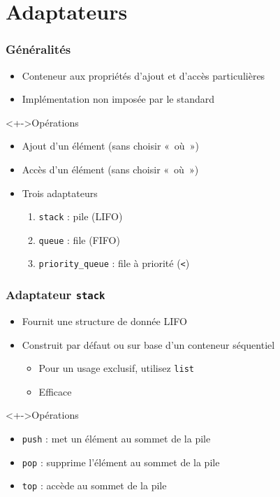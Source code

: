 \section{Adaptateurs}

\begin{frame}
\frametitle{Généralités}
\begin{itemize}[<+->]
\item Conteneur aux propriétés d'ajout et d'accès particulières
\item Implémentation non imposée par le standard
\end{itemize}
\begin{exampleblock}<+->{Opérations}
	\begin{itemize}[<+->]
	\item Ajout d'un élément (sans choisir «~où~»)
	\item Accès d'un élément (sans choisir «~où~»)
	\end{itemize}
\end{exampleblock}
\begin{itemize}[<+->]
\item Trois adaptateurs
	\begin{enumerate}
	\item \texttt{stack} : pile (LIFO)
	\item \texttt{queue} : file (FIFO)
	\item \lstinline{priority_queue} : file à priorité (\texttt{<})
	\end{enumerate}
\end{itemize}
\end{frame}

\begin{frame}
\frametitle{Adaptateur \lstinline|stack|}
\begin{itemize}[<+->]
\item Fournit une structure de donnée LIFO
\item Construit par défaut ou sur base d'un conteneur séquentiel
	\begin{itemize}
	\item Pour un usage exclusif, utilisez \texttt{list}
	\item Efficace
	\end{itemize}
\end{itemize}
\begin{exampleblock}<+->{Opérations}
	\begin{itemize}[<+->]
	\item \lstinline|push| : met un élément au sommet de la pile
	\item \lstinline|pop| : supprime l'élément au sommet de la pile
	\item \lstinline|top| : accède au sommet de la pile
	\end{itemize}
\end{exampleblock}
\end{frame}

